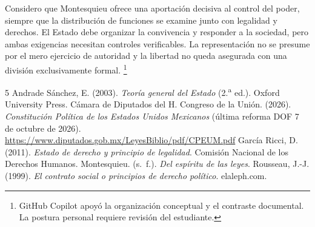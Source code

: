 \documentclass[12pt,spanish,letterpaper,oneside]{article}
\begin{document}
Considero que Montesquieu ofrece una aportaci\'on decisiva al control del
poder, siempre que la distribuci\'on de funciones se examine junto con
legalidad y derechos. El Estado debe organizar la convivencia y responder
a la sociedad, pero ambas exigencias necesitan controles verificables.
La representaci\'on no se presume por el mero ejercicio de autoridad y
la libertad no queda asegurada con una divisi\'on exclusivamente formal.
\footnote{GitHub Copilot apoy\'o la organizaci\'on conceptual y el contraste
documental. La postura personal requiere revisi\'on del estudiante.}

\clearpage
\begin{thebibliography}{5}
Andrade S\'anchez, E. (2003). \emph{Teor\'ia general del Estado} (2.\textsuperscript{a} ed.). Oxford University Press.
C\'amara de Diputados del H. Congreso de la Uni\'on. (2026). \emph{Constituci\'on Pol\'itica de los Estados Unidos Mexicanos} (\'ultima reforma DOF 7 de octubre de 2026). \url{https://www.diputados.gob.mx/LeyesBiblio/pdf/CPEUM.pdf}
Garc\'ia Ricci, D. (2011). \emph{Estado de derecho y principio de legalidad}. Comisi\'on Nacional de los Derechos Humanos.
Montesquieu. (s.~f.). \emph{Del esp\'iritu de las leyes}.
Rousseau, J.-J. (1999). \emph{El contrato social o principios de derecho pol\'itico}. elaleph.com.
\end{thebibliography}
\end{document}
